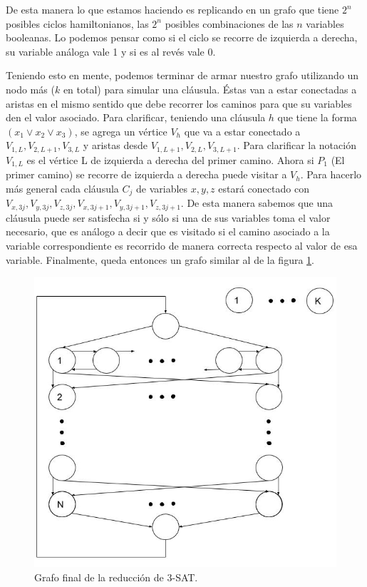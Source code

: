 \documentclass[a4paper,10pt]{article}
\begin{document}
	De esta manera lo que estamos haciendo es replicando en un grafo que tiene $2^n$ posibles ciclos hamiltonianos, las $2^n$ posibles combinaciones de las $n$ variables booleanas. Lo podemos pensar como si el ciclo se recorre de izquierda a derecha, su variable análoga vale 1 y si es al revés vale 0.

	Teniendo esto en mente, podemos terminar de armar nuestro grafo utilizando un nodo más ($k$ en total) para simular una cláusula. Éstas van a estar conectadas a aristas en el mismo sentido que debe recorrer los caminos para que su variables den el valor asociado. Para clarificar, teniendo una cláusula $h$ que tiene la forma $(x_1 \vee x_2 \vee x_3)$, se agrega un vértice $V_h$ que va a estar conectado a $V_{1,L}, V_{2,L+1}, V_{3,L}$ y aristas desde $V_{1,L+1}, V_{2,L}, V_{3,L+1}$. Para clarificar la notación $V_{1,L}$ es el vértice L de izquierda a derecha del primer camino. Ahora si $P_1$ (El primer camino) se recorre de izquierda a derecha puede visitar a $V_h$. Para hacerlo más general cada cláusula $C_j$ de variables $x, y, z$ estará conectado con $V_{x,3j}, V_{y,3j}, V_{z,3j}, V_{x,3j+1}, V_{y,3j+1}, V_{z,3j+1}$. De esta manera sabemos que una cláusula puede ser satisfecha si y sólo si una de sus variables toma el valor necesario, que es análogo a decir que es visitado si el camino asociado a la variable correspondiente es recorrido de manera correcta respecto al valor de esa variable. Finalmente, queda entonces un grafo similar al de la figura \ref{fig:punto-3-2}.

	\begin{figure}[!htb]
		\centering
		\includegraphics[scale=0.35]{images/grafo-3-2.jpg}
		\caption{Grafo final de la reducción de 3-SAT.}
		\label{fig:punto-3-2}
	\end{figure}
\end{document}
